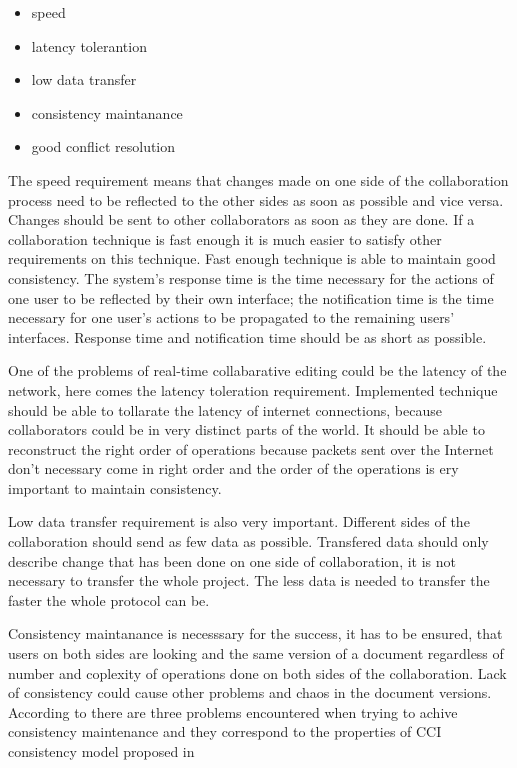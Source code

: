\documentclass[12pt,oneside]{fithesis2}
\begin{document}
\begin{itemize}
\item speed
\item latency tolerantion
\item low data transfer
\item consistency maintanance
\item good conflict resolution
\end{itemize}
\par The speed requirement means that changes made on one side of the collaboration process need to be reflected to the other sides as soon as possible and vice versa. Changes should be sent to other collaborators as soon as they are done. If a collaboration technique is fast enough it is much easier to satisfy other requirements on this technique. Fast enough technique is able to maintain good consistency. The system’s response time is the time necessary for the actions of one user to be reflected by their own interface; the notification time is the time necessary for one user’s actions to be propagated to the remaining users’ interfaces.\cite{Ellis} Response time and notification time should be as short as possible.  \par One of the problems of real-time collabarative editing could be the latency of the network, here comes the latency toleration requirement. Implemented technique should be able to tollarate the latency of internet connections, because collaborators could be in very distinct parts of the world. It should be able to reconstruct the right order of operations because packets sent over the Internet don't necessary come in right order and the order of the operations is ery important to maintain consistency.\par Low data transfer requirement is also very important. Different sides of the collaboration should send as few data as possible. Transfered data should only describe change that has been done on one side of collaboration, it is not necessary to transfer the whole project. The less data is needed to transfer the faster the whole protocol can be.  \par Consistency maintanance is necesssary for the success, it has to be ensured, that users on both sides are looking and the same version of a document regardless of number and coplexity of operations done on both sides of the collaboration. Lack of consistency could cause other problems and chaos in the document versions. According to \cite{Vidot} there are three problems encountered when trying to achive consistency maintenance and they correspond to the properties of CCI consistency model proposed in \cite{Sun}
\end{document}
